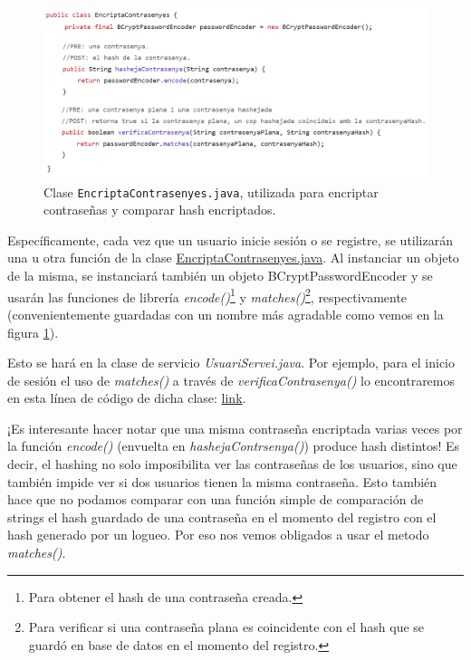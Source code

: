 \documentclass[a4paper,12pt]{report}
\begin{document}
			\FloatBarrier
			\begin{figure}[H]
				\centering
				\caption{Clase \texttt{EncriptaContrasenyes.java}, utilizada para encriptar contraseñas y comparar hash encriptados.}
				\label{fig:hashejatContrasenyes}
				\includegraphics[width=1\linewidth]{img/hashejatContrasenyes.png}
			\end{figure}
			\FloatBarrier
			
			Específicamente, cada vez que un usuario inicie sesión o se registre, se utilizarán una u otra función de la clase \href{https://github.com/blackcub3s/mercApp/blob/main/APP%20WEB/__springboot__produccio__/app/src/main/java/miApp/app/utils/EncriptaContrasenyes.java}{EncriptaContrasenyes.java}. Al instanciar un objeto de la misma, se instanciará también un objeto BCryptPasswordEncoder y se usarán las funciones de librería \textit{encode()}\footnote{Para obtener el hash de una contraseña creada.} y \textit{matches()}\footnote{Para verificar si una contraseña plana es coincidente con el hash que se guardó en base de datos en el momento del registro.}, respectivamente (convenientemente guardadas con un nombre más agradable como vemos en la figura \ref{fig:hashejatContrasenyes}).
			
			Esto se hará en la clase de servicio \textit{UsuariServei.java}. Por ejemplo, para el inicio de sesión el uso de \textit{matches()} a través de \textit{ verificaContrasenya()} lo encontraremos en esta línea de código de dicha clase:  \href{https://github.com/blackcub3s/mercApp/blob/e8afa7110971dca00a660bd8ec5f1a565b852fbd/APP%20WEB/__springboot__produccio__/app/src/main/java/miApp/app/Usuaris/servei/UsuariServei.java#L67}{link}.
			

			
			
			¡Es interesante hacer notar que una misma contraseña encriptada varias veces por la función \textit{encode()} (envuelta en \textit{hashejaContrsenya()}) produce hash distintos! Es decir, el hashing no solo imposibilita ver las contraseñas de los usuarios, sino que también impide ver si dos usuarios tienen la misma contraseña. Esto también hace que no podamos comparar con una función simple de comparación de strings el hash guardado de una contraseña en el momento del registro con el hash generado por un logueo. Por eso nos vemos obligados a usar el metodo \textit{matches()}.
			
\end{document}

